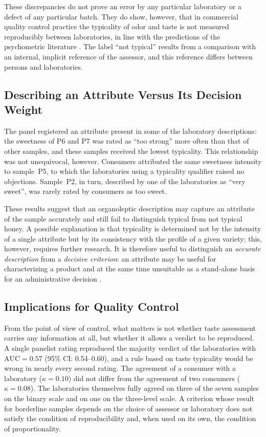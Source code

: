 These discrepancies do not prove an error by any particular laboratory or a
defect of any particular batch. They do show, however, that in commercial
quality control practice the typicality of odor and taste is not measured
reproducibly between laboratories, in line with the predictions of the
psychometric literature
\cite{bartoshuk2003labeled,hodgson2009concordance,sipos2021panel}. The label
``not typical'' results from a comparison with an internal, implicit reference
of the assessor, and this reference differs between persons and laboratories.

\subsection{Describing an Attribute Versus Its Decision Weight}

The panel registered an attribute present in some of the laboratory
descriptions: the sweetness of P6 and P7 was rated as ``too strong'' more
often than that of other samples, and these samples received the lowest
typicality. This relationship was not unequivocal, however. Consumers
attributed the same sweetness intensity to sample~P5, to which the laboratories
using a typicality qualifier raised no objections. Sample~P2, in turn,
described by one of the laboratories as ``very sweet'', was rarely rated by
consumers as too sweet.

These results suggest that an organoleptic description may capture an
attribute of the sample accurately and still fail to distinguish typical from
not typical honey. A possible explanation is that typicality is determined not
by the intensity of a single attribute but by its consistency with the profile
of a given variety; this, however, requires further research. It is therefore
useful to distinguish an \emph{accurate description} from a \emph{decisive
criterion}: an attribute may be useful for characterizing a product and at the
same time unsuitable as a stand-alone basis for an administrative decision
\cite{Gajda2026}.

\subsection{Implications for Quality Control}

From the point of view of control, what matters is not whether taste
assessment carries any information at all, but whether it allows a verdict to
be reproduced. A single panelist rating reproduced the majority verdict of the
laboratories with $\mathrm{AUC} = 0.57$ (95\% CI: 0.54--0.60), and a rule
based on taste typicality would be wrong in nearly every second rating. The
agreement of a consumer with a laboratory ($\kappa = 0.10$) did not differ
from the agreement of two consumers ($\kappa = 0.08$). The laboratories
themselves fully agreed on three of the seven samples on the binary scale and
on one on the three-level scale. A criterion whose result for borderline
samples depends on the choice of assessor or laboratory does not satisfy the
condition of reproducibility and, when used on its own, the condition of
proportionality.

